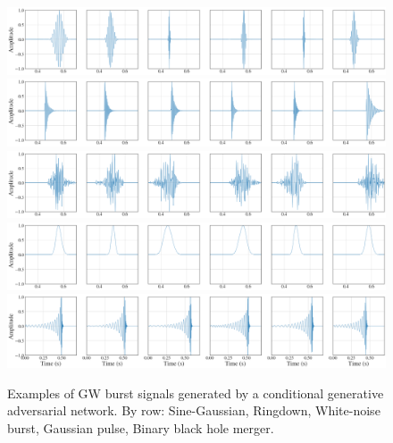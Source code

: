 \documentclass[12pt]{iopart}
\begin{document}
\begin{figure}
    \centering
    \includegraphics[width=\textwidth]{figures/generations/sg.png}
    \includegraphics[width=\textwidth]{figures/generations/rd.png}
    \includegraphics[width=\textwidth]{figures/generations/wnb.png}
    \includegraphics[width=\textwidth]{figures/generations/blip.png}
    \includegraphics[width=\textwidth]{figures/generations/bbh.png}
    \caption{Examples of \ac{GW} burst signals generated by a conditional generative adversarial network. By row: Sine-Gaussian, Ringdown,
White-noise burst, Gaussian pulse, Binary black hole merger.}
\label{fig:gen_signals} \end{figure}
\end{document}
